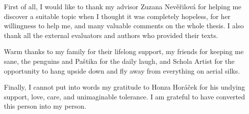 First of all, I would like to thank my advisor Zuzana Nevěřilová for helping me discover a suitable topic when I thought it was completely hopeless, for her willingness to help me, and many valuable comments on the whole thesis. I also thank all the external evaluators and authors who provided their texts.

Warm thanks to my family for their lifelong support, my friends for keeping me sane, the penguins and Paštika for the daily laugh, and Schola Artist for the opportunity to hang upside down and fly away from everything on aerial silks.

Finally, I cannot put into words my gratitude to Honza Horáček for his undying support, love, care, and unimaginable tolerance. I am grateful to have converted this person into my person.
